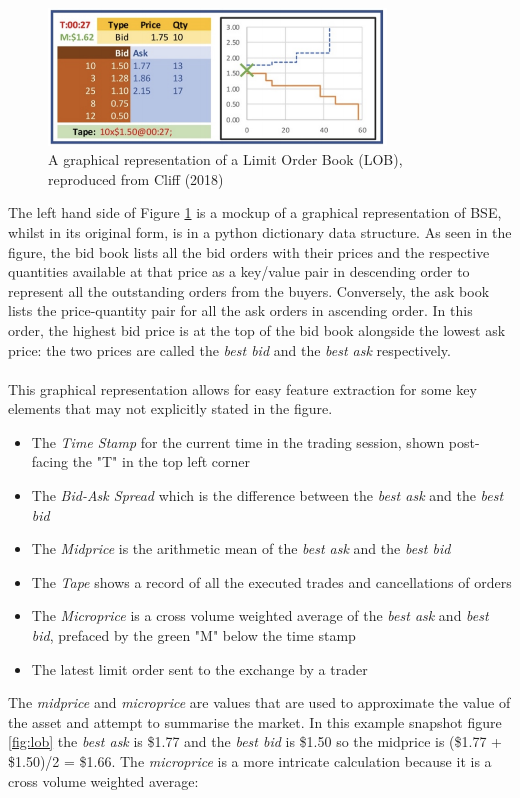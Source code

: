 \documentclass[ %
                    author={Ashwinder Khurana},
                supervisor={Prof Dave Cliff},
                    degree={MEng},
                     title={The Deeply Reinforced Trader},
                  subtitle={},
                      type={enterprise},
                      year={2020} ]{dissertation}
\begin{document}
\begin{figure}[H]
	\centering
	\includegraphics[width=0.8\textwidth]{LOB-Precross.png}
	\caption{A graphical representation of a Limit Order Book (LOB), reproduced from Cliff (2018)}
	\label{fig:Lob}  
\end{figure}
\noindent
The left hand side of Figure \ref{fig:Lob} is a mockup of a graphical representation of BSE, whilst in its original form, is in a python dictionary data structure.
As seen in the figure, the bid book lists all the bid orders with their prices and the respective quantities available at that price as a key/value pair in descending order to represent all the outstanding orders from the buyers. Conversely, the ask book lists the price-quantity pair for all the ask orders in ascending order. In this order, the highest bid price is at the top of the bid book alongside the lowest ask price: the two prices are called the \textit{best bid} and the \textit{best ask} respectively. 
\\
\\
This graphical representation allows for easy feature extraction for some key elements that may not explicitly stated in the figure. 
\begin{itemize}
\item The \textit{Time Stamp} for the current time in the trading session, shown post-facing the "T" in the top left corner
\item The \textit{Bid-Ask Spread} which is the difference between the \textit{best ask} and the \textit{best bid}
\item The \textit{Midprice} is the arithmetic mean of the \textit{best ask} and the \textit{best bid}
\item The \textit{Tape} shows a record of all the executed trades and cancellations of orders
\item The \textit{Microprice} is a cross volume weighted average of the \textit{best ask} and \textit{best bid}, prefaced by the green "M" below the time stamp
\item The latest limit order sent to the exchange by a trader

\end{itemize}
\noindent
The \textit{midprice} and \textit{microprice} are values that are used to approximate the value of the asset and attempt to summarise the market. In this example snapshot figure \ref{fig:lob} the \textit{best ask} is \$1.77 and the \textit{best bid} is \$1.50 so the midprice is (\$1.77 +  \$1.50)/2 = \$1.66. The \textit{microprice} is a more intricate calculation because it is a cross volume weighted average:
\end{document}
